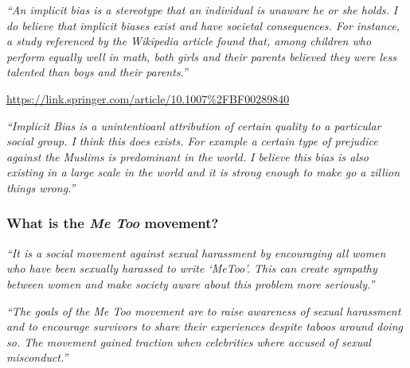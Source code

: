 \documentclass[12pt]{beamer}
\newcommand\ans[1]{{\it ``#1''}}
\newcommand\gap{\vspace{5mm}}
\begin{document}
\begin{frame}
  
  \ans{An implicit bias is a stereotype that an individual is unaware he or she holds.  I do believe that implicit biases exist and have societal consequences.  For instance, a study referenced by the Wikipedia article found that, among children who perform equally well in math, both girls and their parents believed they were less talented than boys and their parents.}
  
\url{https://link.springer.com/article/10.1007\%2FBF00289840}

\end{frame}

\begin{frame}
  \ans{Implicit Bias is  a  unintentioanl  attribution  of  certain  quality  to  a  particular  social group. I think this does exists.  For example a certain type of prejudice against the Muslims is predominant in the world.  I believe this bias is also existing in a large scale in the world and it is strong enough to make go a zillion things wrong.}
  
  \end{frame}

      
\begin{frame} %

  \frametitle{What is the {\em Me Too} movement?}


  \ans{It is a social movement against sexual harassment by encouraging all women who have been sexually harassed to write `MeToo'. This can create sympathy between women and make society aware about this problem more seriously.}
  
  \gap
  
  \ans{The goals of the Me Too movement are to raise awareness of sexual harassment and to encourage survivors to share their experiences despite taboos around doing so.  The movement gained traction when celebrities where accused of sexual misconduct.}
  
\end{frame}
\end{document}
